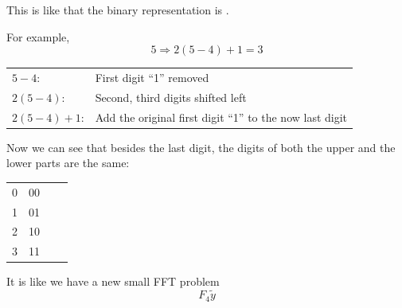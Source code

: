 This is like that the binary representation is .

For example,
\begin{equation*}
    5 \Rightarrow 2(5-4) + 1 = 3
\end{equation*}
\begin{tabular}{ll}
    $5-4$:  &First digit ``1'' removed\\
    $2(5-4)$: &  Second, third digits shifted left\\
    $2(5-4)+1$: & Add the original first digit ``1'' to the now last digit
\end{tabular}

Now we can see that besides the last digit, the  digits of both the upper and the lower parts are the same:
\begin{center}
\begin{tabular}{rrrr}
    0 & 00 \\
    1 & 01 \\
    2 & 10 \\
    3 & 11 \\
\end{tabular}
\end{center}
It is like we have a new small FFT problem \[
    F_4 \tilde{y}
\]
